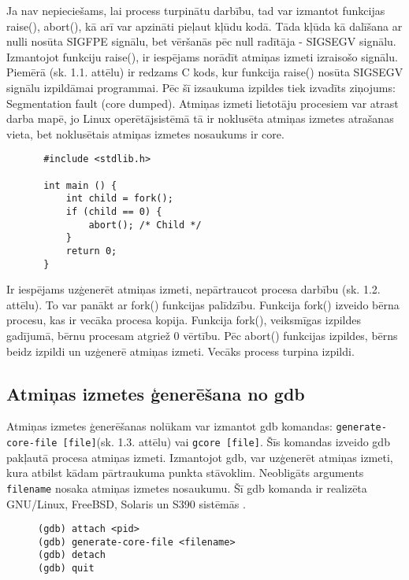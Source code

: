 Ja nav nepieciešams, lai process turpinātu darbību, tad var izmantot funkcijas raise(), abort(), kā arī var apzināti pieļaut kļūdu kodā.
Tāda kļūda kā dalīšana ar nulli nosūta SIGFPE signālu, bet vēršanās pēc null radītāja - SIGSEGV signālu.
Izmantojot funkciju raise(), ir iespējams norādīt atmiņas izmeti izraisošo signālu.
Piemērā (sk. 1.1. attēlu) ir redzams C kods, kur funkcija raise() nosūta SIGSEGV signālu izpildāmai programmai. 
Pēc šī izsaukuma izpildes tiek izvadīts ziņojums: Segmentation fault (core dumped).
Atmiņas izmeti lietotāju procesiem var atrast darba mapē, jo Linux operētājsistēmā tā ir noklusēta atmiņas izmetes atrašanas vieta, bet noklusētais atmiņas izmetes nosaukums ir core.
\begin{figure}[h]
\begin{lstlisting}
 #include <stdlib.h>

 int main () {
     int child = fork();
     if (child == 0) {
         abort(); /* Child */
     }
     return 0;
 }
 \end{lstlisting}
\caption{\textbf{\fontsize{11}{12}\selectfont {Atmiņas izmetes ģenerēšana, turpinot procesa darbību}}}
\end{figure}

Ir iespējams uzģenerēt atmiņas izmeti, nepārtraucot procesa darbību (sk. 1.2. attēlu). 
To var panākt ar fork() funkcijas palīdzību. Funkcija fork() izveido bērna procesu, kas ir vecāka procesa kopija.
Funkcija fork(), veiksmīgas izpildes gadījumā, bērnu procesam atgriež 0 vērtību. 
Pēc abort() funkcijas izpildes, bērns beidz izpildi un uzģenerē atmiņas izmeti. Vecāks process turpina izpildi.




\subsection{Atmiņas izmetes ģenerēšana no gdb}

Atmiņas izmetes ģenerēšanas nolūkam var izmantot gdb komandas: \texttt{generate-core-file [file]}(sk. 1.3. attēlu) vai \texttt{gcore [file]}. Šīs komandas izveido gdb pakļautā procesa atmiņas izmeti. 
Izmantojot gdb, var uzģenerēt atmiņas izmeti, kura atbilst kādam pārtraukuma punkta stāvoklim. 
Neobligāts arguments \texttt{filename} nosaka atmiņas izmetes nosaukumu. Šī gdb komanda ir realizēta GNU/Linux, FreeBSD, Solaris un S390 sistēmās \cite {gdb_gen_core}.
\begin{figure}[h]
\begin{lstlisting}
(gdb) attach <pid>
(gdb) generate-core-file <filename>
(gdb) detach
(gdb) quit
 \end{lstlisting}
\caption{\textbf{\fontsize{11}{12}\selectfont {Atmiņas izmetes ģenerēšana, izmantojot gdb}}}
\end{figure}



